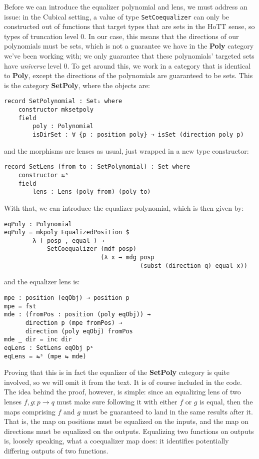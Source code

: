 Before we can introduce the equalizer polynomial and lens, we must address an issue: in the Cubical setting, a value of type \texttt{SetCoequalizer} can only be constructed out of functions that target types that are sets in the HoTT sense, so types of truncation level 0. In our case, this means that the directions of our polynomials must be sets, which is not a guarantee we have in the \textbf{Poly} category we've been working with; we only guarantee that these polynomials' targeted sets have \textit{universe} level 0. To get around this, we work in a category that is identical to \textbf{Poly}, except the directions of the polynomials are guaranteed to be sets. This is the category \textbf{SetPoly}, where the objects are:

\begin{verbatim}
record SetPolynomial : Set₁ where
    constructor mksetpoly
    field
        poly : Polynomial
        isDirSet : ∀ {p : position poly} → isSet (direction poly p)
\end{verbatim}
and the morphisms are lenses as usual, just wrapped in a new type constructor:
\begin{verbatim}
record SetLens (from to : SetPolynomial) : Set where
    constructor ⇆ˢ
    field
        lens : Lens (poly from) (poly to)
\end{verbatim}

With that, we can introduce the equalizer polynomial, which is then given by:
\begin{verbatim}
eqPoly : Polynomial
eqPoly = mkpoly EqualizedPosition $ 
        λ ( posp , equal ) → 
            SetCoequalizer (mdf posp) 
                           (λ x → mdg posp 
                                      (subst (direction q) equal x))
\end{verbatim}
and the equalizer lens is:
\begin{verbatim}
mpe : position (eqObj) → position p
mpe = fst
mde : (fromPos : position (poly eqObj)) → 
      direction p (mpe fromPos) → 
      direction (poly eqObj) fromPos
mde _ dir = inc dir
eqLens : SetLens eqObj pˢ
eqLens = ⇆ˢ (mpe ⇆ mde)
\end{verbatim}

Proving that this is in fact the equalizer of the \textbf{SetPoly} category is quite involved, so we will omit it from the text. It is of course included in the code. The idea behind the proof, however, is simple: since an equalizing lens of two lenses $f,g : p \rightarrow q$ must make sure following it with either $f$ or $g$ is equal, then the maps comprising $f$ and $g$ must be guaranteed to land in the same results after it. That is, the map on positions must be equalized on the inputs, and the map on directions must be equalized on the outputs. Equalizing two functions on outputs is, loosely speaking, what a coequalizer map does: it identifies potentially differing outputs of two functions.

